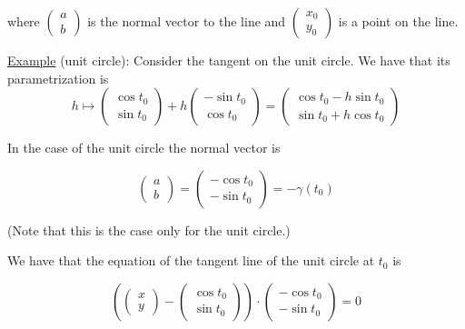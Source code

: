 \documentclass[10pt]{extarticle}
\begin{document}
where $\begin{pmatrix}
        a \\ b
    \end{pmatrix}$ is the normal vector to the line and $\begin{pmatrix}
        x_0 \\ y_0
    \end{pmatrix}$ is a point on the line.


\underline{Example} (unit circle):
Consider the tangent on the unit circle. We have that its parametrization is
$$
    h \mapsto \begin{pmatrix}
        \cos t_0 \\ \sin t_0
    \end{pmatrix} + h \begin{pmatrix}
        -\sin t_0 \\ \cos t_0
    \end{pmatrix} =
    \begin{pmatrix}
        \cos t_0 - h \sin t_0 \\
        \sin t_0 + h \cos t_0
    \end{pmatrix}
$$

In the case of the unit circle the normal vector is

$$
    \begin{pmatrix}
        a \\ b
    \end{pmatrix}
    =
    \begin{pmatrix}
        -\cos t_0 \\ -\sin t_0
    \end{pmatrix}
    =
    - \gamma(t_0)
$$

(Note that this is the case only for the unit circle.)

We have that the equation of the tangent line of the unit circle at $t_0$ is

$$
    \left(
    \begin{pmatrix}
            x \\ y
        \end{pmatrix} - \begin{pmatrix}
            \cos t_0 \\ \sin t_0
        \end{pmatrix}
    \right)
    \cdot
    \begin{pmatrix}
        -\cos t_0 \\ -\sin t_0
    \end{pmatrix}
    = 0
$$
\end{document}
